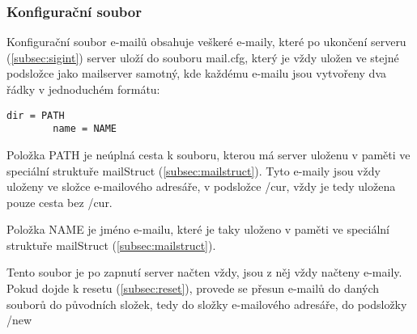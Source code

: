 \documentclass[11pt,a4paper]{report}
\begin{document}
    \subsubsection{Konfigurační soubor}
    \label{subsec:config}
    Konfigurační soubor e-mailů obsahuje veškeré e-maily, které po ukončení serveru (\ref{subsec:sigint}) server uloží do souboru mail.cfg, který je vždy uložen ve stejné podsložce jako mailserver samotný, kde každému e-mailu jsou vytvořeny dva řádky v jednoduchém formátu:
    \lstset{frameround=fttt}
    \begin{lstlisting}[frame=trBL]
        dir = PATH
        name = NAME
    \end{lstlisting}\par
    Položka PATH je neúplná cesta k souboru, kterou má server uloženu v paměti ve speciální struktuře mailStruct (\ref{subsec:mailstruct}). Tyto e-maily jsou vždy uloženy ve složce e-mailového adresáře, v podsložce /cur, vždy je tedy uložena pouze cesta bez /cur. \par
    Položka NAME je jméno e-mailu, které je taky uloženo v paměti ve speciální struktuře mailStruct (\ref{subsec:mailstruct}).\par
    Tento soubor je po zapnutí server načten vždy, jsou z něj vždy načteny e-maily. Pokud dojde k resetu (\ref{subsec:reset}), provede se přesun e-mailů do daných souborů do původních složek, tedy do složky e-mailového adresáře, do podsložky /new
\end{document}
